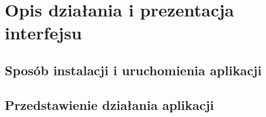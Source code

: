 \section{Opis działania i prezentacja interfejsu}
\subsection{Sposób instalacji i uruchomienia aplikacji}
\subsection{Przedstawienie działania aplikacji}
